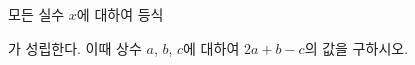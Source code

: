 모든 실수 $x$에 대하여 등식\par\smallskip{}\par\smallskip\noindent 가 성립한다. 이때 상수 $a$, $b$, $c$에 대하여 $2a+b-c$의 값을 구하시오.
